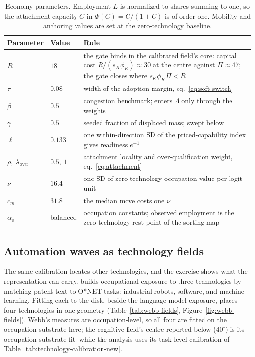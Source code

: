 \documentclass[12pt, a4paper]{article}
\begin{document}
\begin{table}[!htbp]
\centering
\caption{Economy parameters. Employment $L$ is normalized to shares
summing to one, so the attachment capacity $C$ in $\Phi(C)=C/(1+C)$ is
of order one. Mobility and anchoring values are set at the
zero-technology baseline.}
\label{tab:economy-parameters}
\begin{tabular}{ll>{\raggedright\arraybackslash}p{8.2cm}}
\toprule
Parameter & Value & Rule \\
\midrule
$R$ & $18$ & the gate binds in the calibrated field's core: capital
cost $R/(s_K\phi_K)\approx30$ at the centre against $\Pi\approx47$;
the gate closes where $s_K\phi_K\Pi<R$ \\
$\tau$ & $0.08$ & width of the adoption margin, eq.~\eqref{eq:soft-switch} \\
$\beta$ & $0.5$ & congestion benchmark; enters $\Lambda$ only through
the weights \\
$\gamma$ & $0.5$ & seeded fraction of displaced mass; swept below \\
$\ell$ & $0.133$ & one within-direction SD of the priced-capability
index gives readiness $e^{-1}$ \\
$\rho,\ \lambda_{\mathrm{over}}$ & $0.5,\ 1$ & attachment locality and
over-qualification weight, eq.~\eqref{eq:attachment} \\
$\nu$ & $16.4$ & one SD of zero-technology occupation value per logit unit \\
$c_m$ & $31.8$ & the median move costs one $\nu$ \\
$\alpha_o$ & balanced & occupation constants; observed employment is the
zero-technology rest point of the sorting map \\
\bottomrule
\end{tabular}
\end{table}

\subsection{Automation waves as technology fields}
\label{sec:automation-waves}

The same calibration locates other technologies, and the exercise shows
what the representation can carry. \textcite{webb2020} builds
occupational exposure to three technologies by matching patent text to
O*NET tasks: industrial robots, software, and machine learning. Fitting
each to the disk, beside the language-model exposure, places four
technologies in one geometry (Table~\ref{tab:webb-fields},
Figure~\ref{fig:webb-fields}). Webb's measures are occupation-level, so
all four are fitted on the occupation substrate here; the cognitive
field's centre reported below ($40^\circ$) is its occupation-substrate
fit, while the analysis uses its task-level calibration of
Table~\ref{tab:technology-calibration-new}.
\end{document}
